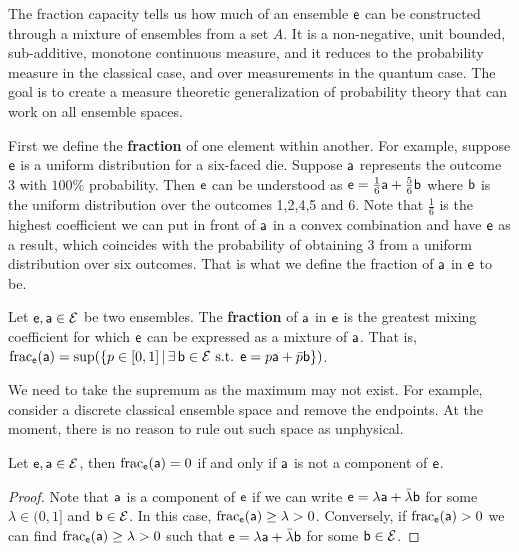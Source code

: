 The fraction capacity tells us how much of an ensemble $\ens$ can be constructed through a mixture of ensembles from a set $A$. It is a non-negative, unit bounded, sub-additive, monotone continuous measure, and it reduces to the probability measure in the classical case, and over measurements in the quantum case. The goal is to create a measure theoretic generalization of probability theory that can work on all ensemble spaces.

First we define the \textbf{fraction} of one element within another. For example, suppose $\ens$ is a uniform distribution for a six-faced die. Suppose $\ens[a]$ represents the outcome 3 with $100\%$ probability. Then $\ens$ can be understood as $\ens = \frac{1}{6} \ens[a] + \frac{5}{6} \ens[b]$ where $\ens[b]$ is the uniform distribution over the outcomes 1,2,4,5 and 6. Note that $\frac{1}{6}$ is the highest coefficient we can put in front of $\ens[a]$ in a convex combination and have $\ens$ as a result, which coincides with the probability of obtaining 3 from a uniform distribution over six outcomes. That is what we define the fraction of $\ens[a]$ in $\ens$ to be.


\begin{mathSection}
	\begin{defn}
		Let $\ens, \ens[a] \in \Ens$ be two ensembles. The \textbf{fraction} of $\ens[a]$ in $\ens$ is the greatest mixing coefficient for which $\ens$ can be expressed as a mixture of $\ens[a]$. That is, $\size_{\ens}(\ens[a]) = \sup(\{ p \in [0,1] \, | \, \exists \, \ens[b] \in \Ens \text{ s.t. }  \ens = p \ens[a] + \bar{p} \ens[b] \})$.
	\end{defn}
	
	\begin{remark}
		We need to take the supremum as the maximum may not exist. For example, consider a discrete classical ensemble space and remove the endpoints. At the moment, there is no reason to rule out such space as unphysical.
	\end{remark}
	
	\begin{coro}
		Let $\ens, \ens[a] \in \Ens$, then $\size_{\ens}(\ens[a]) = 0$ if and only if $\ens[a]$ is not a component of $\ens$.
	\end{coro}
	
	\begin{proof}
		Note that $\ens[a]$ is a component of $\ens$ if we can write $\ens = \lambda \ens[a] + \bar{\lambda} \ens[b]$ for some $\lambda \in (0,1]$ and $\ens[b] \in \Ens$. In this case, $\size_{\ens}(\ens[a]) \geq \lambda > 0$. Conversely, if $\size_{\ens}(\ens[a]) > 0$ we can find $\size_{\ens}(\ens[a]) \geq \lambda > 0$ such that $\ens = \lambda \ens[a] + \bar{\lambda} \ens[b]$ for some $\ens[b] \in \Ens$.
	\end{proof}
\end{mathSection}

